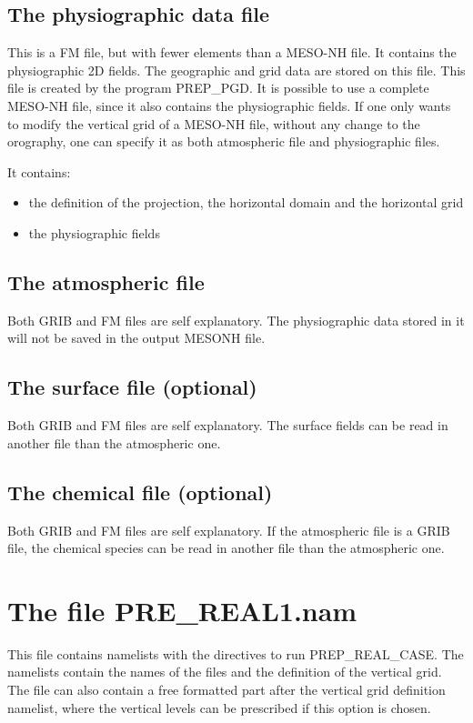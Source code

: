\subsection{The physiographic data file}
This is a FM file, but with fewer elements than a MESO-NH file. It contains
the physiographic 2D fields. The geographic and grid data are stored on this 
file.
This file is created by the program PREP\_PGD.
It is possible to use a complete MESO-NH file, since it also contains
the physiographic fields.
If one only wants to modify the vertical grid of
a MESO-NH file, without any change to the orography, one can specify it as both  atmospheric file and physiographic files.

It contains:
\begin{itemize}
\item the definition of the projection, the horizontal domain and the 
horizontal grid
\item the physiographic fields
\end{itemize}

\subsection{The atmospheric file}
Both GRIB and FM files are self explanatory.
The physiographic data stored in it will not be saved in the output
MESONH file.

\subsection{The surface file (optional)}
Both GRIB and FM files are self explanatory. The surface fields can be read in another file than the atmospheric one.
 
\subsection{The chemical file (optional)}
Both GRIB and FM files are self explanatory. If the atmospheric file is a GRIB
file, the chemical species can be read in another file than the atmospheric one.
 
\newpage
\section{The file PRE\_REAL1.nam}
This file contains namelists with the directives to run PREP\_REAL\_CASE.
The namelists contain the names of the files and the definition of
the vertical grid.  The file can also contain a free formatted part after the vertical grid
definition namelist, where  the vertical levels can be prescribed  if this
option is chosen.
